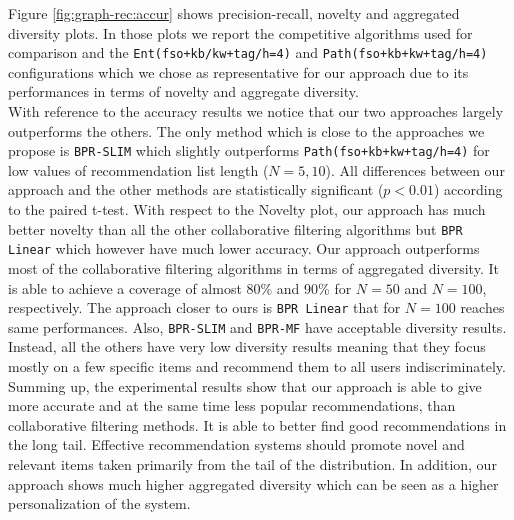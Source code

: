 Figure \ref{fig:graph-rec:accur} shows precision-recall, novelty and aggregated diversity plots. In those plots we report the competitive algorithms used for comparison and the \texttt{Ent(fso+kb/kw+tag/h=4)} and \texttt{Path(fso+kb+kw+tag/h=4)} configurations which we chose as representative for our approach due to its performances in terms of novelty and aggregate diversity. 
\\With reference to the accuracy results we notice that our two approaches largely outperforms the others. The only method which is close to the approaches we propose is \texttt{BPR-SLIM} which slightly outperforms \texttt{Path(fso+kb+kw+tag/h=4)} for low values of recommendation list length ($N=5,10$). All differences between our approach and the other methods are statistically significant ($p<0.01$) according to the paired t-test.
With respect to the Novelty plot, our approach has much better novelty than all the other collaborative filtering algorithms but \texttt{BPR Linear} which however have much lower accuracy. 
Our approach outperforms most of the collaborative filtering algorithms in terms of aggregated diversity. It is able to achieve a coverage of almost 80\% and 90\% for $N=50$ and $N=100$, respectively. The approach closer to ours is \texttt{BPR Linear} that for $N=100 $ reaches same performances. Also, \texttt{BPR-SLIM} and \texttt{BPR-MF} have acceptable diversity results. Instead, all the others have very low diversity results meaning that they focus mostly on a few specific items and recommend them to all users indiscriminately. 
\\Summing up, the experimental results show that our approach is able to give more accurate and at the same time less popular recommendations, than collaborative filtering methods. It is able to better find good recommendations in the long tail. 
Effective recommendation systems should promote novel and relevant items taken primarily from the tail of the distribution. 
In addition, our approach shows much higher aggregated diversity which can be seen as a higher personalization of the system. 

